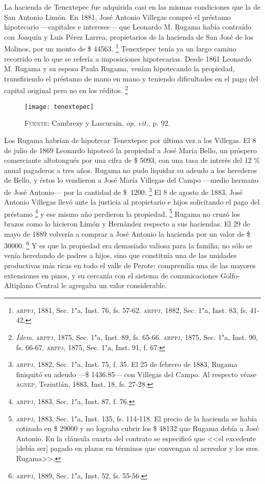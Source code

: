 \documentclass[14pt,twoside,final]{extbook} %
\let\oldfootnote\footnote
\renewcommand\footnote[1]{%
\oldfootnote{\hspace{1mm}#1}}
\begin{document}
La hacienda de Tenextepec fue adquirida casi en las mismas condiciones que la de San Antonio Limón. En 1881, José Antonio Villegas compró el préstamo hipotecario ---capitales e intereses--- que Leonardo M. Rugama había contraído con Joaquín y Luis Pérez Larrea, propietarios de la hacienda de San José de los Molinos, por un monto de \$ 44563.\footnote{\textsc{arppj}, 1881, Sec. 1"a, Inst. 76, fs. 57-62. \textsc{arppj}, 1882, Sec. 1"a, Inst. 83, fs. 41-42.} Tenextepec tenía ya un largo camino recorrido en lo que se refería a imposiciones hipotecarias. Desde 1861 Leonardo M. Rugama y su esposa Paula Rugama, venían hipotecando la propiedad, transfiriendo el préstamo de mano en mano y teniendo dificultades en el pago del capital original pero no en los réditos.\footnote{\emph{Ídem}. \textsc{arppj}, 1875, Sec. 1"a, Inst. 89, fs. 65-66. \textsc{arppj}, 1875, Sec. 1"a, Inst. 90, fs. 66-67. \textsc{arppj}, 1875, Sec. 1"a, Inst. 91, f. 67.}
\begin{sidewaysfigure}
\centering
\texttt{[image: tenextepec]}
\caption[Plano de la hacienda de Tenextepec]{\textsc{Fuente:} Cambrezy y Lascurain, \emph{op. cit.}, p. 92.}
\label{fig:hda-tenextepec}
\end{sidewaysfigure}

Los Rugama habrían de hipotecar Tenextepec por última vez a los Villegas. El 8 de julio de 1869 Leonardo hipotecó la propiedad a José María Bello, un próspero comerciante altotongués por una cifra de \$ 5093, con una tasa de interés del 12 \% anual pagaderos a tres años. Rugama no pudo liquidar su adeudo a los herederos de Bello, y éstos lo vendieron a José María Villegas del Campo ---medio hermano de José Antonio--- por la cantidad de \$~1200.\footnote{\textsc{arppj}, 1882, Sec. 1"a, Inst. 75, f. 35. El 25 de febrero de 1883, Rugama finiquitó su adeudo ---\$ 1436.85--- con Villegas del Campo. Al respecto véase \textsc{agnep}, Teziutlán, 1883, Inst. 18, fs. 27-28.} El 8 de agosto de 1883, José Antonio Villegas llevó ante la justicia al propietario e hijos solicitando el pago del préstamo\footnote{\textsc{arppj}, 1883, Sec. 1"a, Inst. 87, f. 76.} y ese mismo año perdieron la propiedad.\footnote{\textsc{arppj}, 1883, Sec. 1"a, Inst. 135, fs. 114-118. El precio de la hacienda se había cotizado en \$ 29000 y no lograba cubrir los \$ 48132 que Rugama debía a José Antonio. En la cláusula cuarta del contrato se especificó que <<el excedente [debía ser] pagado en plazos en términos que convengan al acreedor y los sres. Rugama>>.} Rugama no cruzó los brazos como lo hicieron
Limón y Hernández respecto a sus haciendas. El 29 de mayo de 1889 volvería a comprar a José Antonio la hacienda por un valor de \$ 30000.\footnote{\textsc{arppj}, 1889, Sec. 1"a, Inst. 52, fs. 55-56.} Y es que la propiedad era demasiado valiosa para la familia; no sólo se venía heredando de padres a hijos, sino que constituía una de las unidades productivas más ricas en todo el valle de Perote: comprendía una de las mayores extensiones en pinos, y su cercanía con el sistema de comunicaciones Golfo-Altiplano Central le agregaba un valor considerable.
\end{document}

